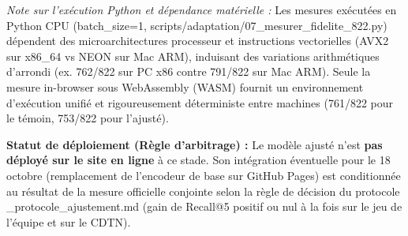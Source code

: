 \documentclass[11pt,a4paper]{article}
\newcommand{\code}[1]  {{\ttfamily #1}}
\newcommand{\rulebreak}{}
\begin{document}
\textit{Note sur l'exécution Python et dépendance matérielle :} Les mesures exécutées en Python CPU (\code{batch\_\allowbreak{}size=1}, \code{scripts/\allowbreak{}adaptation/\allowbreak{}07\_\allowbreak{}mesurer\_\allowbreak{}fidelite\_\allowbreak{}822.\allowbreak{}py}) dépendent des microarchitectures processeur et instructions vectorielles (AVX2 sur x86\_64 vs NEON sur Mac ARM), induisant des variations arithmétiques d'arrondi (ex. 762/822 sur PC x86 contre 791/822 sur Mac ARM). Seule la mesure in-browser sous WebAssembly (WASM) fournit un environnement d'exécution unifié et rigoureusement déterministe entre machines (761/822 pour le témoin, 753/822 pour l'ajusté).
\begin{callout}
\textbf{Statut de déploiement (Règle d'arbitrage) :}   Le modèle ajusté n'est \textbf{pas déployé sur le site en ligne} à ce stade. Son intégration éventuelle pour le 18 octobre (remplacement de l'encodeur de base sur GitHub Pages) est conditionnée au résultat de la mesure officielle conjointe selon la règle de décision du protocole \code{05\_\allowbreak{}protocole\_\allowbreak{}ajustement.\allowbreak{}md} (gain de Recall@5 positif ou nul à la fois sur le jeu de l'équipe et sur le CDTN).
\end{callout}
\rulebreak
\end{document}
